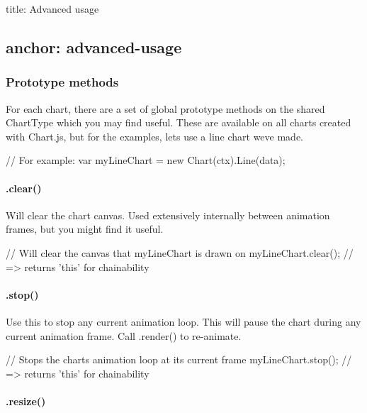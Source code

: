 

 title\+: Advanced usage \subsection*{anchor\+: advanced-\/usage }

\subsubsection*{Prototype methods}

For each chart, there are a set of global prototype methods on the shared {\ttfamily Chart\+Type} which you may find useful. These are available on all charts created with Chart.\+js, but for the examples, let\textquotesingle{}s use a line chart we\textquotesingle{}ve made.


\begin{DoxyCode}
// For example:
var myLineChart = new Chart(ctx).Line(data);
\end{DoxyCode}


\paragraph*{.clear()}

Will clear the chart canvas. Used extensively internally between animation frames, but you might find it useful.


\begin{DoxyCode}
// Will clear the canvas that myLineChart is drawn on
myLineChart.clear();
// => returns 'this' for chainability
\end{DoxyCode}


\paragraph*{.stop()}

Use this to stop any current animation loop. This will pause the chart during any current animation frame. Call {\ttfamily .render()} to re-\/animate.


\begin{DoxyCode}
// Stops the charts animation loop at its current frame
myLineChart.stop();
// => returns 'this' for chainability
\end{DoxyCode}


\paragraph*{.resize()}


